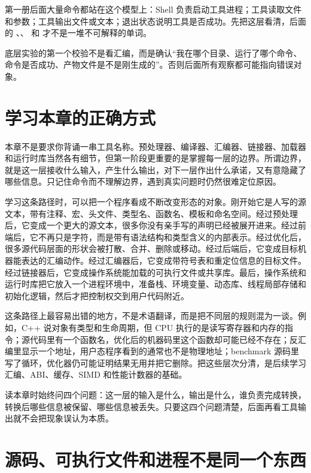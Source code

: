第一册后面大量命令都站在这个模型上：Shell 负责启动工具进程；工具读取文件和参数；工具输出文件或文本；退出状态说明工具是否成功。先把这层看清，后面的 、、 和  才不是一堆不可解释的单词。

\begin{warningbox}
底层实验的第一个校验不是看汇编，而是确认“我在哪个目录、运行了哪个命令、命令是否成功、产物文件是不是刚生成的”。否则后面所有观察都可能指向错误对象。
\end{warningbox}

\section{学习本章的正确方式}

本章不是要求你背诵一串工具名称。预处理器、编译器、汇编器、链接器、加载器和运行时库当然各有细节，但第一阶段更重要的是掌握每一层的边界。所谓边界，就是这一层接收什么输入，产生什么输出，对下一层作出什么承诺，又有意隐藏了哪些信息。只记住命令而不理解边界，遇到真实问题时仍然很难定位原因。

学习这条路径时，可以把一个程序看成不断改变形态的对象。刚开始它是人写的源文本，带有注释、宏、头文件、类型名、函数名、模板和命名空间。经过预处理后，它变成一个更大的源文本，很多你没有亲手写的声明已经被展开进来。经过前端后，它不再只是字符，而是带有语法结构和类型含义的内部表示。经过优化后，很多源代码层面的形状会被打散、合并、删除或移动。经过后端后，它变成目标机器能表达的汇编动作。经过汇编器后，它变成带符号表和重定位信息的目标文件。经过链接器后，它变成操作系统能加载的可执行文件或共享库。最后，操作系统和运行时库把它放入一个进程环境中，准备栈、环境变量、动态库、线程局部存储和初始化逻辑，然后才把控制权交到用户代码附近。

这条路径上最容易出错的地方，不是术语翻译，而是把不同层的规则混为一谈。例如，C++ 说对象有类型和生命周期，但 CPU 执行的是读写寄存器和内存的指令；源代码里有一个函数名，优化后的机器码里这个函数却可能已经不存在；反汇编里显示一个地址，用户态程序看到的通常也不是物理地址；benchmark 源码里写了循环，优化器仍可能证明结果无用并把它删除。把这些层次分清，是后续学习汇编、ABI、缓存、SIMD 和性能计数器的基础。

\begin{mentalmodel}
读本章时始终问四个问题：这一层的输入是什么，输出是什么，谁负责完成转换，转换后哪些信息被保留、哪些信息被丢失。只要这四个问题清楚，后面再看工具输出就不会把现象误认为本质。
\end{mentalmodel}

\section{源码、可执行文件和进程不是同一个东西}

